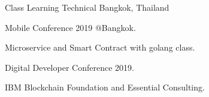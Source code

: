 

\begin{cventries}

    \cventry
    {Class Learning} %
    {Technical} %
    {} %
    {Bangkok, Thailand} %
    {
      \begin{cvitems} %
        \item {Mobile Conference 2019 @Bangkok.}
        \item {Microservice and Smart Contract with golang class.}
        \item {Digital Developer Conference 2019.}
        \item {IBM Blockchain Foundation and Essential Consulting.}
      \end{cvitems}
    }

\end{cventries}

